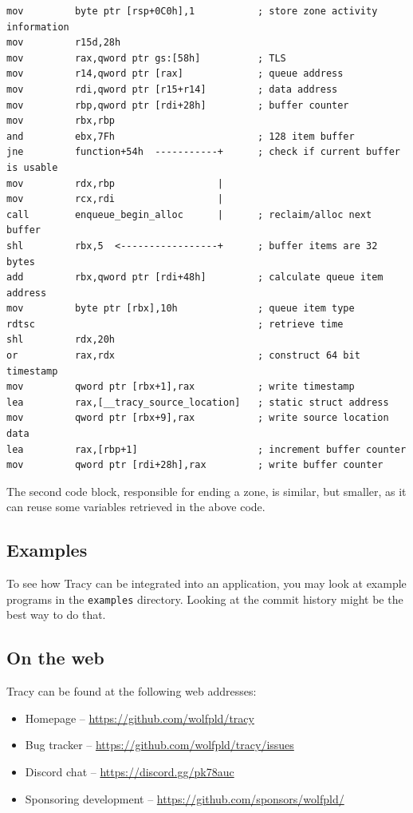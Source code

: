 \documentclass[hidelinks,titlepage,a4paper]{article}
\begin{document}
\begin{lstlisting}[language={[x86masm]Assembler}]
mov         byte ptr [rsp+0C0h],1           ; store zone activity information
mov         r15d,28h
mov         rax,qword ptr gs:[58h]          ; TLS
mov         r14,qword ptr [rax]             ; queue address
mov         rdi,qword ptr [r15+r14]         ; data address
mov         rbp,qword ptr [rdi+28h]         ; buffer counter
mov         rbx,rbp
and         ebx,7Fh                         ; 128 item buffer
jne         function+54h  -----------+      ; check if current buffer is usable
mov         rdx,rbp                  |
mov         rcx,rdi                  |
call        enqueue_begin_alloc      |      ; reclaim/alloc next buffer
shl         rbx,5  <-----------------+      ; buffer items are 32 bytes
add         rbx,qword ptr [rdi+48h]         ; calculate queue item address
mov         byte ptr [rbx],10h              ; queue item type
rdtsc                                       ; retrieve time
shl         rdx,20h
or          rax,rdx                         ; construct 64 bit timestamp
mov         qword ptr [rbx+1],rax           ; write timestamp
lea         rax,[__tracy_source_location]   ; static struct address
mov         qword ptr [rbx+9],rax           ; write source location data
lea         rax,[rbp+1]                     ; increment buffer counter
mov         qword ptr [rdi+28h],rax         ; write buffer counter
\end{lstlisting}

The second code block, responsible for ending a zone, is similar, but smaller, as it can reuse some variables retrieved in the above code.

\subsection{Examples}

To see how Tracy can be integrated into an application, you may look at example programs in the \texttt{examples} directory. Looking at the commit history might be the best way to do that.

\subsection{On the web}

Tracy can be found at the following web addresses:

\begin{itemize}
\item Homepage -- \url{https://github.com/wolfpld/tracy}
\item Bug tracker -- \url{https://github.com/wolfpld/tracy/issues}
\item Discord chat -- \url{https://discord.gg/pk78auc}
\item Sponsoring development -- \url{https://github.com/sponsors/wolfpld/}
\end{itemize}
\end{document}
